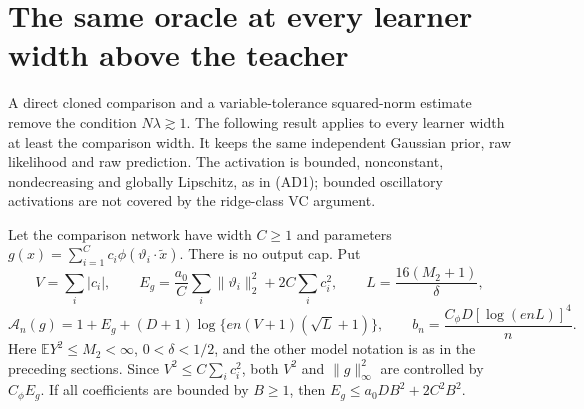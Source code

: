 \section{The same oracle at every learner width above the teacher}
\label{sec:all-width-finite-variance}
A direct cloned comparison and a variable-tolerance squared-norm estimate
remove the condition $N\lambda\gtrsim1$. The following result applies to
every learner width at least the comparison width. It keeps the same
independent Gaussian prior, raw likelihood and raw prediction.
The activation is bounded, nonconstant, nondecreasing and globally
Lipschitz, as in (AD1); bounded oscillatory activations are not covered
by the ridge-class VC argument.

Let the comparison network have width $C\ge1$ and parameters
$g(x)=\sum_{i=1}^C c_i\phi(\vartheta_i\cdot\widetilde x)$.
There is no output cap. Put
\[
 V=\sum_i|c_i|,\qquad
 E_g=\frac{a_0}{C}\sum_i\|\vartheta_i\|_2^2
                       +2C\sum_i c_i^2,\qquad
 L=\frac{16(M_2+1)}\delta,
\]
\[
 \mathcal A_n(g)=1+E_g+(D+1)
       \log\{e n(V+1)(\sqrt L+1)\},\qquad
 b_n=\frac{C_\phi D[\log(e nL)]^4}{n}.                 \tag{AW1}
\]
Here $\mathbb E Y^2\le M_2<\infty$, $0<\delta<1/2$, and the other
model notation is as in the preceding sections. Since
$V^2\le C\sum_i c_i^2$, both $V^2$ and $\|g\|_\infty^2$ are
controlled by $C_\phi E_g$. If all coefficients are bounded by $B\ge1$,
then $E_g\le a_0D B^2+2C^2B^2$.


